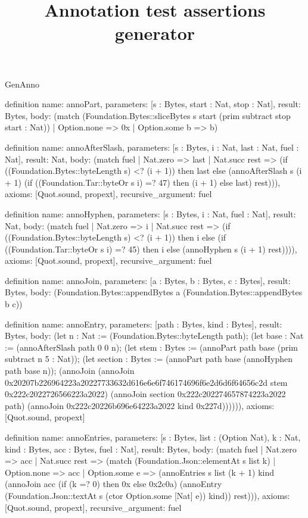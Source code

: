 \begin{lexlean}{GenAnno}
\title{Annotation test assertions generator}
\begin{semanticmodule}
definition{
  name: annoPart,
  parameters: [s : Bytes, start : Nat, stop : Nat],
  result: Bytes,
  body: (match (Foundation.Bytes::sliceBytes s start (prim subtract stop start : Nat))
    | Option.none => 0x
    | Option.some b => b)
}

definition{
  name: annoAfterSlash,
  parameters: [s : Bytes, i : Nat, last : Nat, fuel : Nat],
  result: Nat,
  body: (match fuel
    | Nat.zero => last
    | Nat.succ rest => (if ((Foundation.Bytes::byteLength s) <? (i + 1)) then last else (annoAfterSlash s (i + 1) (if ((Foundation.Tar::byteOr s i) =? 47) then (i + 1) else last) rest))),
  axioms: [Quot.sound, propext],
  recursive_argument: fuel
}

definition{
  name: annoHyphen,
  parameters: [s : Bytes, i : Nat, fuel : Nat],
  result: Nat,
  body: (match fuel
    | Nat.zero => i
    | Nat.succ rest => (if ((Foundation.Bytes::byteLength s) <? (i + 1)) then i else (if ((Foundation.Tar::byteOr s i) =? 45) then i else (annoHyphen s (i + 1) rest)))),
  axioms: [Quot.sound, propext],
  recursive_argument: fuel
}

definition{
  name: annoJoin,
  parameters: [a : Bytes, b : Bytes, c : Bytes],
  result: Bytes,
  body: (Foundation.Bytes::appendBytes a (Foundation.Bytes::appendBytes b c))
}

definition{
  name: annoEntry,
  parameters: [path : Bytes, kind : Bytes],
  result: Bytes,
  body: (let n : Nat := (Foundation.Bytes::byteLength path); (let base : Nat := (annoAfterSlash path 0 0 n); (let stem : Bytes := (annoPart path base (prim subtract n 5 : Nat)); (let section : Bytes := (annoPart path base (annoHyphen path base n)); (annoJoin (annoJoin 0x20207b226964223a20227733632d616e6e6f746174696f6e2d6d6f64656c2d stem 0x222c2022726566223a2022) (annoJoin section 0x222c202274657874223a2022 path) (annoJoin 0x222c20226b696e64223a2022 kind 0x227d)))))),
  axioms: [Quot.sound, propext]
}

definition{
  name: annoEntries,
  parameters: [s : Bytes, list : (Option Nat), k : Nat, kind : Bytes, acc : Bytes, fuel : Nat],
  result: Bytes,
  body: (match fuel
    | Nat.zero => acc
    | Nat.succ rest => (match (Foundation.Json::elementAt s list k)
      | Option.none => acc
      | Option.some e => (annoEntries s list (k + 1) kind (annoJoin acc (if (k =? 0) then 0x else 0x2c0a) (annoEntry (Foundation.Json::textAt s (ctor Option.some [Nat] e)) kind)) rest))),
  axioms: [Quot.sound, propext],
  recursive_argument: fuel
}


\end{semanticmodule}
\end{lexlean}
